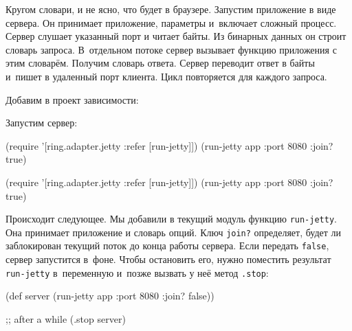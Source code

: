 \fi


Кругом словари, и не ясно, что будет в браузере. Запустим приложение в виде
сервера. Он принимает приложение, параметры и~включает сложный процесс. Сервер
слушает указанный порт и читает байты. Из бинарных данных он строит словарь
запроса. В~отдельном потоке сервер вызывает функцию приложения с этим
словарём. Получим словарь ответа. Сервер переводит ответ в байты и~пишет в
удаленный порт клиента. Цикл повторяется для каждого запроса.


Добавим в проект зависимости:

\begin{english}
  \begin{clojure}
  \end{clojure}
\end{english}

Запустим сервер:

\ifnarrow

\begin{english}
  \begin{clojure}
(require '[ring.adapter.jetty
           :refer [run-jetty]])
(run-jetty app {:port 8080 :join? true})
  \end{clojure}
\end{english}

\else

\begin{english}
  \begin{clojure}
(require '[ring.adapter.jetty :refer [run-jetty]])
(run-jetty app {:port 8080 :join? true})
  \end{clojure}
\end{english}

\fi

Происходит следующее. Мы добавили в текущий модуль функцию \verb|run-jetty|. Она
принимает приложение и словарь опций. Ключ \verb|join?| определяет, будет ли
заблокирован текущий поток до конца работы сервера. Если передать \verb|false|,
сервер запустится в~фоне. Чтобы остановить его, нужно поместить результат
\verb|run-jetty| в~переменную и~позже вызвать у неё метод \verb|.stop|:

\ifnarrow

\begin{english}
  \begin{clojure}
(def server
  (run-jetty app {:port 8080
                  :join? false}))

;; after a while
(.stop server)
  \end{clojure}
\end{english}

